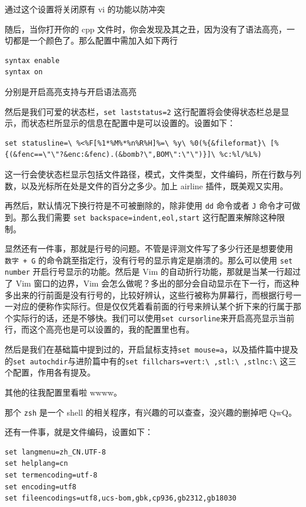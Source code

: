 通过这个设置将关闭原有 vi 的功能以防冲突

随后，当你打开你的 cpp 文件时，你会发现及其之丑，因为没有了语法高亮，一切都是一个颜色了。那么配置中需加入如下两行

\begin{verbatim}
syntax enable
syntax on
\end{verbatim}

分别是开启高亮支持与开启语法高亮

然后是我们可爱的状态栏，\texttt{set laststatus=2} 这行配置将会使得状态栏总是显示，而状态栏所显示的信息在配置中是可以设置的。设置如下：

\begin{verbatim}
set statusline=\ %<%F[%1*%M%*%n%R%H]%=\ %y\ %0(%{&fileformat}\ [%{(&fenc==\"\"?&enc:&fenc).(&bomb?\",BOM\":\"\")}]\ %c:%l/%L%)
\end{verbatim}

这一行会使状态栏显示包括文件路径，模式，文件类型，文件编码，所在行数与列数，以及光标所在处是文件的百分之多少。加上 airline 插件，既美观又实用。

再然后，默认情况下换行符是不可被删除的，除非使用 \texttt{dd} 命令或者 \texttt{J} 命令才可做到。那么我们需要 \texttt{set backspace=indent,eol,start} 这行配置来解除这种限制。

显然还有一件事，那就是行号的问题。不管是评测文件写了多少行还是想要使用 \texttt{数字 + G} 的命令跳至指定行，没有行号的显示肯定是崩溃的。那么可以使用 \texttt{set number} 开启行号显示的功能。然后是 Vim 的自动折行功能，那就是当某一行超过了 Vim 窗口的边界，Vim 会怎么做呢？多出的部分会自动显示在下一行，而这种多出来的行前面是没有行号的，比较好辨认，这些行被称为屏幕行，而根据行号一一对应的便称作实际行。但是仅仅凭着看前面的行号来辨认某个折下来的行属于那个实际行的话，还是不够快。我们可以使用\texttt{set cursorline}来开启高亮显示当前行，而这个高亮也是可以设置的，我的配置里也有。

然后是我们在基础篇中提到过的，开启鼠标支持\texttt{set mouse=a}，以及插件篇中提及的\texttt{set autochdir}与进阶篇中有的\texttt{set fillchars=vert:\textbackslash{} ,stl:\textbackslash{} ,stlnc:\textbackslash{}} 这三个配置，作用各有提及。

其他的往我配置里看啦 wwww。

那个 \texttt{zsh} 是一个 shell 的相关程序，有兴趣的可以查查，没兴趣的删掉吧 QwQ。

还有一件事，就是文件编码，设置如下：

\begin{verbatim}
set langmenu=zh_CN.UTF-8
set helplang=cn
set termencoding=utf-8
set encoding=utf8
set fileencodings=utf8,ucs-bom,gbk,cp936,gb2312,gb18030
\end{verbatim}

